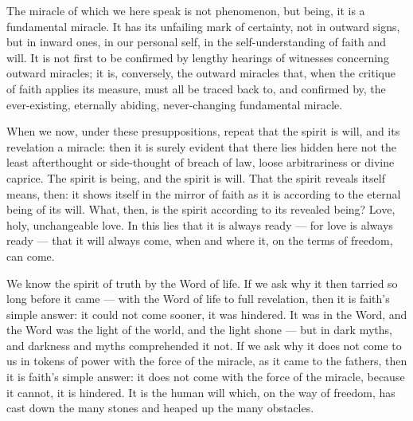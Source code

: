 \documentclass[12pt,a4paper,openany]{book}
\newcommand{\opage}[1]{\marginnote{\footnotesize\textit{[#1]}}}
\begin{document}
The miracle of which we here speak is not phenomenon,
but being, it is a fundamental miracle. It has its unfailing
mark of certainty, not in outward signs, but in inward ones,
in our personal self, in the self-understanding of faith and will.
It is not first to be confirmed by lengthy hearings of witnesses
concerning outward miracles; it is, conversely, the outward miracles that,
when the critique of faith applies its measure, must all be traced
back to, and confirmed by, the ever-existing, eternally abiding,
never-changing fundamental miracle.

When we now, under these presuppositions, repeat that
the spirit is will, and its revelation %
a miracle: then it is
surely evident that there lies hidden here not the least
afterthought or side-thought of breach of law, loose arbitrariness or
divine caprice. The spirit is being, and the spirit is
will. That the spirit reveals itself means, then: it shows
itself in the mirror of faith as it is according to the eternal
being of its will. What, then, is the spirit according to its revealed being?
Love, holy, unchangeable love. In this lies
that it is always ready --- for love is always
\setcounter{footnote}{0}%
\opage{55}ready ---
that it will always come, when and where it, on
the terms of freedom, can come.

We know the spirit of truth by the Word of life. If we ask
why it then tarried so long before it came ---
with the Word of life to full revelation, then it is faith's
simple answer: it could not come sooner, it was hindered.
It was in the Word, and the Word was the light of the world, and
the light shone --- but in dark myths, and darkness and
myths comprehended it not. If we ask why it does not
come to us in tokens of power with the force of the miracle, as
it came to the fathers, then it is faith's simple answer:
it does not come with the force of the miracle, because it cannot,
it is hindered. It is the human will which,
on the way of freedom, has cast down the many stones and heaped up
the many obstacles.
\end{document}
